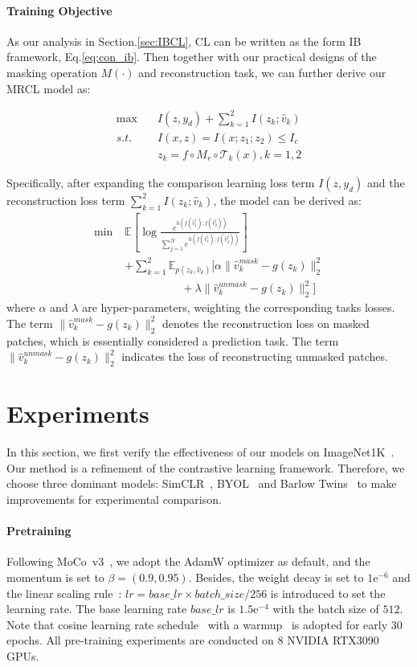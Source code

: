 \documentclass[10pt,twocolumn,letterpaper]{article}
\begin{document}
\paragraph{Training Objective}
As our analysis in Section.\ref{sec:IBCL}, CL can be written as the form IB framework, Eq.\eqref{eq:con_ib}. Then together with our practical designs of the masking operation $M(\cdot)$ and reconstruction task, we can further derive our MRCL model as:

\begin{align}
    \max &\quad I(z,y_{d})+\sum_{k=1}^2 I(z_k;\hat{v}_k)  \\ 
    s.t. &\quad I(x,z) = I(x;z_1;z_2)\le I_c        \\
    &\quad z_k = f\circ M_r\circ\mathcal{T}_{k}(x), k=1,2
\end{align}

Specifically, after expanding the comparison learning loss term $I(z,y_{d})$ and the reconstruction loss term $\sum_{k=1}^2 I(z_k;\hat{v}_k)$, the model can be derived as:
\begin{align}
     \min \; &\mathbb{E}\left[\log\frac{e^{h(f(\hat{v}_1^i);f(\hat{v}_2^i))}}{\sum_{j=1}^Ne^{h(f(\hat{v}_1^i);f(\hat{v}_2^j))}}\right]\nonumber\\
     &+\sum_{k  =1}^2\mathbb{E}_{p(z_k,\hat{v}_k)}[\alpha\|\hat{v}_k^{mask}-g(z_k)\|_2^2\nonumber\\
     &\qquad\qquad\quad+\lambda\|\hat{v}_k^{unmask}-g(z_k)\|_2^2]
\label{eq:loss}
\end{align}
where $\alpha$ and $\lambda$ are hyper-parameters, weighting the corresponding tasks losses.
The term $\|\hat{v}_k^{mask}-g(z_k)\|_2^2$ denotes the reconstruction loss on masked patches, which is essentially considered a prediction task. The term $\|\hat{v}_k^{unmask}-g(z_k)\|_2^2$ indicates the loss of reconstructing unmasked patches.

\section{Experiments}
In this section, we first verify the effectiveness of our models on ImageNet1K~\cite{deng2009imagenet}. Our method is a refinement of the contrastive learning framework. Therefore, we choose three dominant models: SimCLR~\cite{chen2020simple}, BYOL~\cite{grill2020bootstrap} and Barlow Twins~\cite{zbontar2021barlow} to make improvements for experimental comparison.

\paragraph{Pretraining} Following MoCo~v3~\cite{chen2021empirical}, we adopt the AdamW optimizer as default, and the momentum is set to $\beta=(0.9,0.95)$. Besides, the weight decay is set to $1\mathrm{e}^{-6}$ and the linear scaling rule~\cite{goyal2017accurate}: $lr = base\_lr\times batch\_size/256$ is introduced to set the learning rate. The base learning rate $base\_lr$ is $1.5\mathrm{e}^{-4}$ with the batch size of $512$. Note that cosine learning rate schedule~\cite{loshchilov2016sgdr} with a warmup~\cite{goyal2017accurate} is adopted for early 30 epochs. All pre-training experiments are conducted on 8 NVIDIA RTX3090 GPUs.
\end{document}
